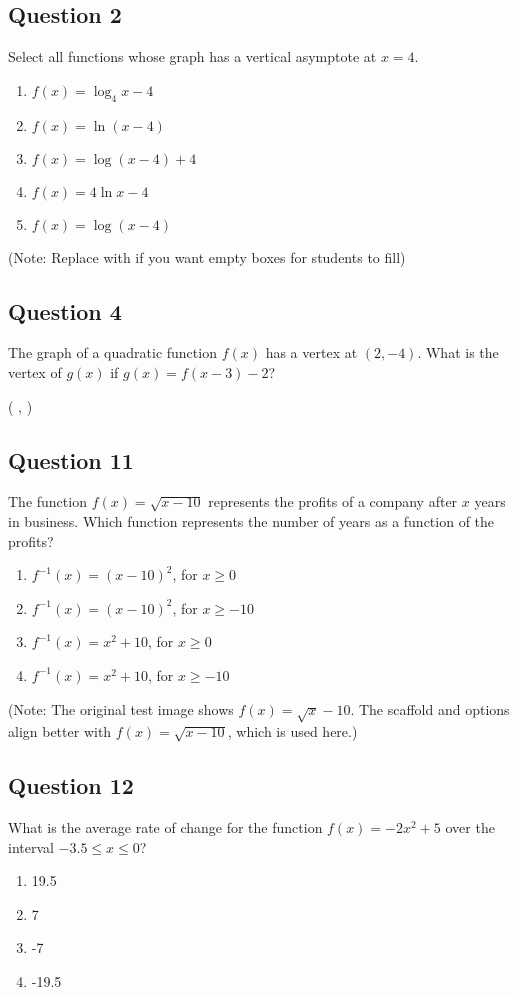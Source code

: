 \documentclass[12pt]{article}
\begin{document}
\subsection*{Question 2}
Select all functions whose graph has a vertical asymptote at \( x = 4 \).
\begin{enumerate}[label=\Alph*.]
    \item[\XBox] \( f(x) = \log_4 x - 4 \) 
    \item[\XBox] \( f(x) = \ln (x - 4) \)
    \item[\XBox] \( f(x) = \log (x - 4) + 4 \)
    \item[\XBox] \( f(x) = 4 \ln x - 4 \)
    \item[\XBox] \( f(x) = \log (x - 4) \)
\end{enumerate}
(Note: Replace \XBox with \Square if you want empty boxes for students to fill)

\subsection*{Question 4}
The graph of a quadratic function \(f(x)\) has a vertex at \( (2, -4) \). What is the vertex of \(g(x)\) if \( g(x) = f(x - 3) - 2 \)?
\begin{center}
( \underline{\hspace{1.5cm}} , \underline{\hspace{1.5cm}} )
\end{center}

\subsection*{Question 11}
The function \( f(x) = \sqrt{x-10} \) represents the profits of a company after \(x\) years in business. Which function represents the number of years as a function of the profits?
\begin{enumerate}[label=\Alph*.]
    \item \( f^{-1}(x) = (x - 10)^2 \), for \( x \geq 0 \)
    \item \( f^{-1}(x) = (x - 10)^2 \), for \( x \geq -10 \)
    \item \( f^{-1}(x) = x^2 + 10 \), for \( x \geq 0 \)
    \item \( f^{-1}(x) = x^2 + 10 \), for \( x \geq -10 \)
\end{enumerate}
(Note: The original test image shows \(f(x)=\sqrt{x}-10\). The scaffold and options align better with \(f(x)=\sqrt{x-10}\), which is used here.)

\subsection*{Question 12}
What is the average rate of change for the function \( f(x) = -2x^2 + 5 \) over the interval \( -3.5 \leq x \leq 0 \)?
\begin{enumerate}[label=\Alph*.]
    \item 19.5
    \item 7
    \item -7
    \item -19.5
\end{enumerate}

\end{document}
